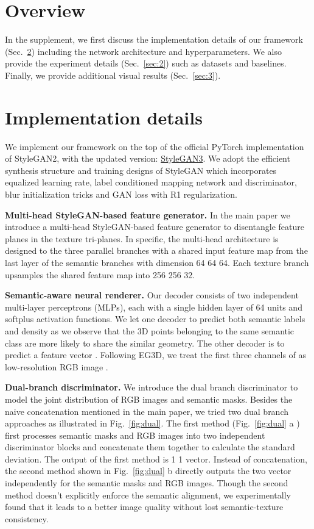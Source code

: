 \documentclass[acmtog]{acmart}
\begin{document}
\appendix

\section{Overview}
In the supplement, we first discuss the implementation details of our framework (Sec.~\ref{sec:1}) including the network architecture and hyperparameters. We also provide the experiment details (Sec.~\ref{sec:2}) such as datasets and baselines. Finally, we provide additional visual results (Sec.~\ref{sec:3}). 
\section{Implementation details}
\label{sec:1}
We implement our framework on the top of the official PyTorch implementation of StyleGAN2, with the updated version: \href{https://github.com/NVlabs/stylegan3}{StyleGAN3}. We adopt the efficient synthesis structure and training designs of StyleGAN which incorporates equalized learning rate, label conditioned mapping network and discriminator, blur initialization tricks and GAN loss with R1 regularization. 

\noindent \textbf{Multi-head StyleGAN-based feature generator.} In the main paper we introduce a multi-head StyleGAN-based feature generator to disentangle feature planes in the texture tri-planes. In specific, the multi-head architecture is designed to the three parallel branches with a shared input feature map from the last layer of the semantic branches with dimension 64  64  64. Each texture branch upsamples the shared feature map into 256  256  32. 

\noindent \textbf{Semantic-aware neural renderer.} Our decoder consists of two independent multi-layer perceptrons (MLPs), each with a single hidden layer of 64 units and softplus activation functions. We let one decoder to predict both semantic labels  and density  as we observe that the 3D points belonging to the same semantic class are more likely to share the similar geometry. The other decoder is to predict a feature vector . Following EG3D\cite{eg3d}, we treat the first three channels of  as low-resolution RGB image . 

\noindent \textbf{Dual-branch discriminator.} 
We introduce the dual branch discriminator to model the joint distribution of RGB images and semantic masks. Besides the naive concatenation mentioned in the main paper, we tried two dual branch approaches as illustrated in Fig.~\ref{fig:dual}. The first method (Fig.~\ref{fig:dual} a ) first processes semantic masks and RGB images into two independent discriminator blocks and concatenate them together to calculate the standard deviation. The output of the first method is 1  1 vector. Instead of concatenation, the second method shown in Fig.~\ref{fig:dual} b directly outputs the two vector independently for the semantic masks and RGB images. Though the second method doesn't explicitly enforce the semantic alignment, we experimentally found that it leads to a better image quality without lost semantic-texture consistency. 
\end{document}
